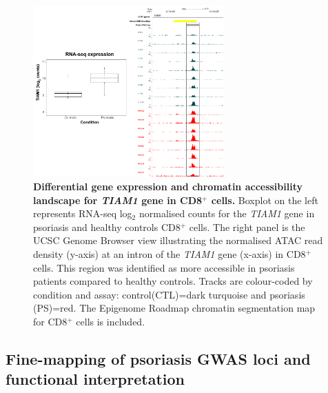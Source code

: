
\begin{figure}[htbp]
\centering
\includegraphics[width=0.65\textwidth]{./Results2/pdfs/ATAC_CD8_peak_TIAM1_RNA_combined}
\caption[Differential gene expression and chromatin accessibility landscape for \textit{TIAM1} gene in CD8$^+$ cells.]{\textbf{Differential gene expression and chromatin accessibility landscape for \textit{TIAM1} gene in CD8$^+$ cells.} Boxplot on the left represents RNA-seq log$_{2}$ normalised counts for the \textit{TIAM1} gene in psoriasis and healthy controls CD8$^+$ cells. The right panel is the UCSC Genome Browser view illustrating the normalised ATAC read density (y-axis) at an intron of the \textit{TIAM1} gene (x-axis) in CD8$^+$ cells. This region was identified as more accessible in psoriasis patients compared to healthy controls. Tracks are colour-coded by condition and assay: control(CTL)=dark turquoise and psoriasis (PS)=red. The Epigenome Roadmap chromatin segmentation map for CD8$^+$ cells is included.}
\label{figure:ATAC_RNAseq_CD8_TIAM1_combined}
\end{figure}



\subsection{Fine-mapping of psoriasis GWAS loci and functional interpretation}

